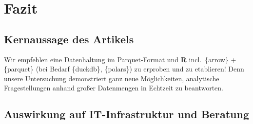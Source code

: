 \documentclass[
  german,
  10pt,
  twoside]{article}
\makeatletter
\newcommand{\berlintime}{%
  \berlinhr=\time\relax
  \divide\berlinhr by 60\relax
  \berlinmin=\time\relax
  \multiply\berlinhr by -60\relax
  \advance\berlinmin by \berlinhr\relax
  \berlinhr=\time\relax
  \divide\berlinhr by 60\relax
  \advance\berlinhr by 1\relax
  \ifnum\berlinhr>23\relax
    \advance\berlinhr by -24\relax
  \fi
  \ifnum\berlinhr<10 0\fi\the\berlinhr:\ifnum\berlinmin<10 0\fi\the\berlinmin%
}
\newif\ifdraftmode
\providecommand{\totalchars}{0}
\providecommand{\totalwords}{0}
\providecommand{\abstractchars}{0}
\providecommand{\abstractwords}{0}
\providecommand{\zusammenfassungchars}{0}
\providecommand{\zusammenfassungwords}{0}
\providecommand{\footnotecountnum}{0}
\providecommand{\citationcountnum}{0}
\newcommand{\doctitle}{$title$}
\newcommand{\docauthors}{$author-short$}
\newcommand{\docpublication}{$publication$}
\newcommand{\docpublicationissue}{$publication-issue$}
\newcommand{\metadatapage}{%
  \clearpage
  \thispagestyle{empty}
  \onecolumn
  \vspace*{1.5cm}
  
  {\raggedright
  {\LARGE\bfseries\color{wistaBlue} Dokument-Metadaten}\\[0.5cm]
  
  \begin{tabular}{@{}ll}
    \textbf{Titel:} & \doctitle \\[0.3em]
    \textbf{Autoren:} & \docauthors \\[0.3em]
    \textbf{Veröffentlichung:} & \docpublication\ \docpublicationissue \\[0.3em]
    \textbf{Erstellungsdatum:} & \today\ um \berlintime\ Uhr \\[0.3em]
  \end{tabular}
  
  \vspace{0.5cm}
  {\color{wistaBlue}\rule{\textwidth}{1pt}}
  \par}
  
  \vspace{1cm}
  
  {\large\bfseries\color{wistaDarkGray} Dokumentstatistik}\\[0.5cm]
  
  \small
  \begin{tabular}{@{}lrrrrrr@{}}
    \toprule
    \textbf{Abschnitt} & \textbf{Wörter} & \textbf{Zeichen} & \textbf{Fußn.} & \textbf{Quellen} & \textbf{Vorgabe} \\
    \midrule
    Insgesamt & \textcolor{wistaBlue}{\textbf{\totalwords}} & \textcolor{wistaBlue}{\textbf{\totalchars}} & \textcolor{wistaBlue}{\textbf{\footnotecountnum}} & \textcolor{wistaBlue}{\textbf{\citationcountnum}} & 30\,000 Z. \\
    Zusammenfassung & \textcolor{wistaBlue}{\textbf{\zusammenfassungwords}} & \textcolor{wistaBlue}{\textbf{\zusammenfassungchars}} & --- & --- & 800 Z. \\
    Abstract & \textcolor{wistaBlue}{\textbf{\abstractwords}} & \textcolor{wistaBlue}{\textbf{\abstractchars}} & --- & --- & 700 Z. \\
    \midrule
    \sectionrows
    \bottomrule
  \end{tabular}
  \normalsize
  
  \vspace{0.5cm}
  
  {\large\bfseries\color{wistaDarkGray} Schlüsselwörter}\\[0.3cm]
  \small
  \schlusselworterlist
  \normalsize
  
  \vspace{0.5cm}
  
  {\large\bfseries\color{wistaDarkGray} Keywords}\\[0.3cm]
  \small
  \keywordslist
  \normalsize
  
  \vspace{1cm}
  
  {\large\bfseries\color{wistaDarkGray} Tabellen}\\[0.3cm]
  
  \small
  \begin{tabular}{@{}lp{12cm}@{}}
    \toprule
    \textbf{Nr.} & \textbf{Beschreibung} \\
    \midrule
    \tablerows
    \bottomrule
  \end{tabular}
  \normalsize
  
  \vspace{1cm}
  
  {\large\bfseries\color{wistaDarkGray} Abbildungen}\\[0.3cm]
  
  \small
  \begin{tabular}{@{}lp{12cm}@{}}
    \toprule
    \textbf{Nr.} & \textbf{Beschreibung} \\
    \midrule
    \figurerows
    \bottomrule
  \end{tabular}
  \normalsize
  
  \clearpage
}
\makeatother
\begin{document}
\newcommand{\tablerows}{            \hyperref[tbl-pkg-versions]{Tabelle~1} & Versionen verfügbarer R-Packages \\
            \hyperref[tbl-baseline]{Tabelle~2} & Baselines in SAS und Stata (anhand 1\% des simuliertes BTP) \\
            \hyperref[tbl-benchmark-small]{Tabelle~3} & Performanz Messungen für die Fallzahlberechnung anhand 1\% des BTP \\
            \hyperref[tbl-benchmark-regr-small]{Tabelle~4} & Performanz Messungen für die Regressionsberechnung anhand 1\% des BTP \\
            \hyperref[tbl-benchmark]{Tabelle~5} & Performanz Messungen für die Fallzahlberechnung anhand 10\% des BTP \\
            \hyperref[tbl-benchmark-regr]{Tabelle~6} & Performanz Messungen für die Regressionsberechnung anhand 10\% des BTP \\
            \hyperref[tbl-bm-cnt-small]{Tabelle~7} & Benchmarkergebnisse für Fallzahlen (kleine Stichproben des BTP) \\
            \hyperref[tbl-bm-reg-small]{Tabelle~8} & Benchmarkergebnisse für Regression (kleine Stichproben des BTP) \\
}
\newcommand{\figurerows}{            \hyperref[fig-optimization-strategies]{Abbildung~1} & Strategien zur Performanz-Optimierung im FDZ-Bund \\
}
\newcommand{\schlusselworterlist}{}
\newcommand{\keywordslist}{}
\ifdraftmode
\metadatapage
\fi

\setcounter{subsection}{5}

\section{Fazit}\label{sec-ausblick}

\subsection{Kernaussage des Artikels}\label{kernaussage-des-artikels}

Wir empfehlen eine Datenhaltung im Parquet-Format und \textbf{R}
incl.~\{arrow\} + \{parquet\} (bei Bedarf \{duckdb\}, \{polars\}) zu
erproben und zu etablieren! Denn unsere Untersuchung demonstriert ganz
neue Möglichkeiten, analytische Fragestellungen anhand großer
Datenmengen in Echtzeit zu beantworten.

\subsection{Auswirkung auf IT-Infrastruktur und
Beratung}\label{auswirkung-auf-it-infrastruktur-und-beratung}
\end{document}
